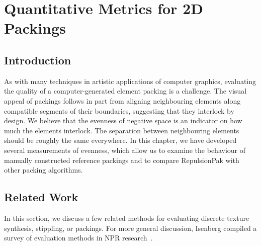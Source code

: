 
\chapter{Quantitative Metrics for 2D Packings}
\label{chapter_qualitative_metrics}


\section{Introduction}


\newtext
{
As with many techniques in artistic applications of computer graphics, evaluating the
quality of a computer-generated element packing is a challenge.
The visual appeal of packings follows in part from aligning neighbouring elements along compatible 
segments of their boundaries, suggesting that they interlock by design. 
We believe that the evenness of negative space is an indicator 
on how much the elements interlock.
The separation between neighbouring elements should be roughly the same everywhere.
In this chapter, we have developed several measurements of evenness,
which allow us to examine the behaviour of manually constructed reference
packings and to compare RepulsionPak with other packing algorithms.
}

\section{Related Work}


\newtext
{
In this section, we discuss a few related methods for evaluating discrete texture synthesis,
stippling, or packings.
For more general discussion, 
Isenberg compiled a survey of evaluation methods in NPR research~\cite{Isenberg2013}.
}

